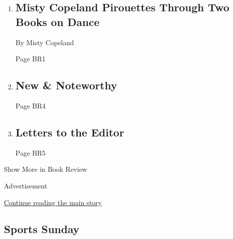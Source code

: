 \begin{enumerate}
\def\labelenumi{\arabic{enumi}.}
\item
  \href{/2018/06/11/books/review/henry-alford-and-then-we-danced.html}{}

  \hypertarget{misty-copeland-pirouettes-through-two-books-on-dance}{%
  \subsection{Misty Copeland Pirouettes Through Two Books on
  Dance}\label{misty-copeland-pirouettes-through-two-books-on-dance}}

  By Misty Copeland

  Page BR1
\item
  \href{/2018/06/12/books/review/new-noteworthy-bonnie-wertheim.html}{}

  \hypertarget{new--noteworthy}{%
  \subsection{New \& Noteworthy}\label{new--noteworthy}}

  Page BR4
\item
  \href{/2018/06/15/books/review/letters-to-the-editor.html}{}

  \hypertarget{letters-to-the-editor}{%
  \subsection{Letters to the Editor}\label{letters-to-the-editor}}

  Page BR5
\end{enumerate}

Show More in Book Review

Advertisement

\protect\hyperlink{after-mid6}{Continue reading the main story}

\hypertarget{sports-sunday}{%
\subsection{Sports Sunday}\label{sports-sunday}}

